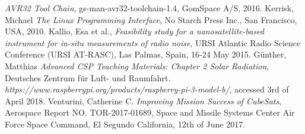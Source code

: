 \documentclass[english,12pt,a4paper,pdftex,elec,utf8]{aaltothesis}
\begin{document}
\begin{thebibliography}{99}
  \textit{AVR32 Tool Chain}, gs-man-avr32-toolchain-1.4, GomSpace A/S, 2016.
 Kerrisk, Michael
  \textit{The Linux Programming Interface}, No Starch Press Inc., San Francisco, USA, 2010.
 Kallio, Esa et al.,
  \textit{Feasibility study for a nanosatellite-based instrument for in-situ measurements of radio noise},  URSI Atlantic Radio Science Conference (URSI AT-RASC), Las Palmas, Spain, 16-24 May 2015.
 Günther, Matthias
  \textit{Advanced CSP Teaching Materials: Chapter 2 Solar Radiation}, Deutsches Zentrum für Luft- und Raumfahrt. 
  \textit{https://www.raspberrypi.org/products/raspberry-pi-3-model-b/}, accessed 3rd of April 2018.
 Venturini, Catherine C.
  \textit{Improving Mission Success of CubeSats}, Aerospace Report NO.
TOR-2017-01689, Space and Missile Systems Center Air Force Space Command, El Segundo California, 12th of June 2017.

\end{thebibliography}

\clearpage

\thesisappendix
\end{document}
